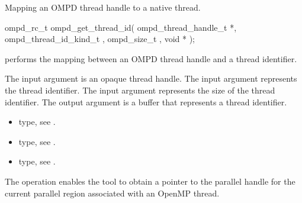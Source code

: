 \label{ompd:ompd_get_thread_id}
\summary
Mapping an OMPD thread handle to a native thread.

\newpage %
\format
\begin{cspecific}
\begin{ompSyntax}
	ompd_rc_t ompd_get_thread_id(
  	ompd_thread_handle_t *,
  	ompd_thread_id_kind_t ,
  	ompd_size_t ,
  	void *
  	);
\end{ompSyntax}
\end{cspecific}

\descr
{} performs the mapping between an OMPD
thread handle and a thread identifier.

\argdesc

The input argument  is an opaque thread handle.
The input argument   represents the thread
identifier. The input argument  represents the size of the 
thread identifier. The output argument  is a buffer that represents a thread identifier.



\crossreferences
\begin{itemize}
	\item {} type, see .
	\item {} type, see .
	\item {} type, see .
\end{itemize}


\label{ompd:ompd_get_current_parallel_handle}
\summary
The   operation enables the tool to obtain a pointer to 
the parallel handle for the current parallel region associated with an OpenMP thread.

